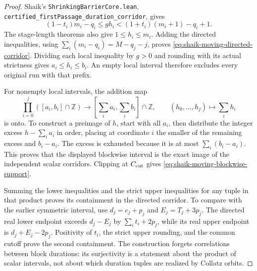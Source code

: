 \documentclass[11pt]{article}
\theoremstyle{remark}\newtheorem{remark}[proposition]{Remark}
\begin{document}
\begin{proof}
Shaik's \texttt{ShrinkingBarrierCore.lean},
\texttt{certified\_firstPassage\_duration\_corridor}, gives
\[
 (1-t_i)m_i-q_i\le gh_i<
 (1+t_i)(m_i+1)-q_i+1.
\]
The stage-length theorems also give \(1\le h_i\le m_i\).
Adding the directed inequalities, using
\(\sum_i(m_i-q_i)=M-q_j-j\), proves
\eqref{eq:shaik-moving-directed-corridor}. Dividing each local
inequality by \(g>0\) and rounding with its actual strictness gives
\(a_i\le h_i\le b_i\). An empty local interval therefore excludes
every original run with that prefix.

For nonempty local intervals, the addition map
\[
 \prod_{i=0}^j([a_i,b_i]\cap\mathbb Z)
       \longrightarrow [\textstyle\sum_i a_i,\sum_i b_i]\cap\mathbb Z,
 \qquad (h_0,\ldots,h_j)\longmapsto\sum_i h_i
\]
is onto. To construct a preimage of \(h\), start with all \(a_i\),
then distribute the integer excess \(h-\sum_i a_i\) in order,
placing at coordinate \(i\) the smaller of the remaining excess
and \(b_i-a_i\). The excess is exhausted because it is at most
\(\sum_i(b_i-a_i)\). This proves that the displayed blockwise
interval is the exact image of the independent scalar corridors.
Clipping at \(C_{\rm cut}\) gives
\eqref{eq:shaik-moving-blockwise-support}.

Summing the lower inequalities and the strict upper inequalities for
any tuple in that product proves its containment in the directed
corridor. To compare with the earlier symmetric interval, use
\(d_j=c_j+p_j\) and \(E_j=T_j+3p_j\). The directed real lower
endpoint exceeds \(d_j-E_j\) by
\(\sum_i t_i+2p_j\), while its real upper endpoint is
\(d_j+E_j-2p_j\). Positivity of \(t_i\), the strict upper rounding,
and the common cutoff prove the second containment.
The construction forgets correlations between block durations:
its surjectivity is a statement about the product of scalar intervals,
not about which duration tuples are realized by Collatz orbits.
\end{proof}
\end{document}
